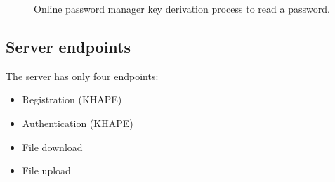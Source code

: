 \documentclass[../report.tex]{subfiles}
\begin{document}
\begin{figure}[h]
 \centering

 \setlength{\fboxsep}{10pt}
 \setlength{\fboxrule}{1pt}

 \caption{Online password manager key derivation process to read a password.}
 \label{fig:Online_password_manager}
\end{figure}



\subsection{Server endpoints}
The server has only four endpoints:

\begin{itemize}
 \item Registration (KHAPE)
 \item Authentication (KHAPE)
 \item File download
 \item File upload
\end{itemize}
\end{document}
